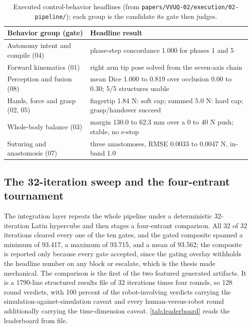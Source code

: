 \begin{table}[H]
\caption{Executed control-behavior headlines (from
\texttt{papers/VVUQ-02/execution/02-pipeline/}); each group is the candidate its
gate then judges.}
\label{tab:behaviors}
\centering
\footnotesize
\begin{tabularx}{\textwidth}{L{5cm} Y}
\toprule
\textbf{Behavior group (gate)} & \textbf{Headline result} \\
\midrule
Autonomy intent and compile (04) & phase-step concordance 1.000 for phases 1 and 5 \\
Forward kinematics (01) & right arm tip pose solved from the seven-axis chain \\
Perception and fusion (08) & mean Dice 1.000 to 0.819 over occlusion 0.00 to 0.30; 5/5 structures usable \\
Hands, force and grasp (02, 05) & fingertip 1.84 N: soft cap; summed 5.0 N: hard cap; grasp/handover succeed \\
Whole-body balance (03) & margin 130.0 to 62.3 mm over a 0 to 40 N push; stable, no e-stop \\
Suturing and anastomosis (07) & three anastomoses, RMSE 0.0033 to 0.0047 N, in-band 1.0 \\
\bottomrule
\end{tabularx}
\end{table}

\subsection{The 32-iteration sweep and the four-entrant tournament}

The integration layer repeats the whole pipeline under a deterministic
32-iteration Latin hypercube and then stages a four-entrant comparison. All 32 of
32 iterations cleared every one of the ten gates, and the gated composite spanned
a minimum of 93.417, a maximum of 93.715, and a mean of 93.562; the composite is
reported only because every gate accepted, since the gating overlay withholds the
headline number on any block or escalate, which is the thesis made mechanical.
The comparison is the first of the two featured generated artifacts. It is a
1790-line structured results file of 32 iterations times four rounds, so 128
round verdicts, with 100 percent of the robot-involving verdicts carrying the
simulation-against-simulation caveat and every human-versus-robot round
additionally carrying the time-dimension caveat.
\autoref{tab:leaderboard} reads the leaderboard from file.

